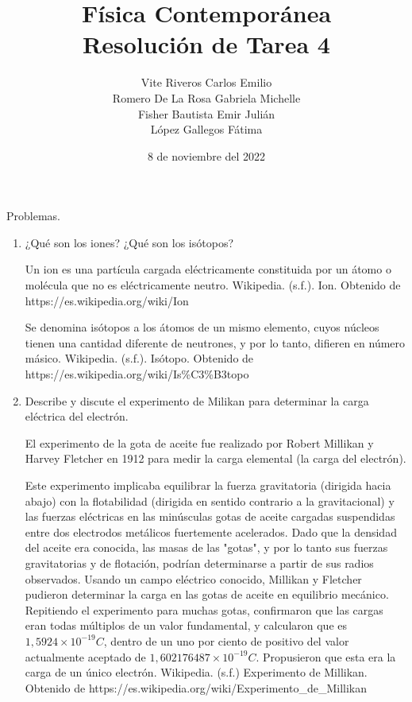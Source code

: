 \documentclass[10pt, a4paper]{article}
\title{Física Contemporánea\\Resolución de Tarea 4}
\author{Vite Riveros Carlos Emilio\\ Romero De La Rosa Gabriela Michelle\\ 
        Fisher Bautista Emir Julián\\ López Gallegos Fátima}
\date{8 de noviembre del 2022}
\begin{document}
    \maketitle

    Problemas.
    \begin{enumerate}
        \item ¿Qué son los iones? ¿Qué son los isótopos?
        
        \begin{center}
            Un ion es una partícula cargada eléctricamente constituida por un átomo o molécula que no es 
            eléctricamente neutro. Wikipedia. (s.f.). Ion. Obtenido de https://es.wikipedia.org/wiki/Ion
            
            Se denomina isótopos a los átomos de un mismo elemento, cuyos núcleos 
            tienen una cantidad diferente de neutrones, y por lo tanto, difieren en número másico.
            Wikipedia. (s.f.). Isótopo. Obtenido de https://es.wikipedia.org/wiki/Is\%C3\%B3topo
            
        \end{center}

        \item Describe y discute el experimento de Milikan para determinar la carga eléctrica del electrón.
        
        \begin{center}
            El experimento de la gota de aceite fue realizado por Robert Millikan y Harvey Fletcher en 1912 
            para medir la carga elemental (la carga del electrón).

            Este experimento implicaba equilibrar la fuerza gravitatoria (dirigida hacia abajo) con la flotabilidad 
            (dirigida en sentido contrario a la gravitacional) y las fuerzas eléctricas en las minúsculas gotas 
            de aceite cargadas suspendidas entre dos electrodos metálicos fuertemente acelerados. Dado que la 
            densidad del aceite era conocida, las masas de las "gotas", y por lo tanto sus fuerzas gravitatorias y 
            de flotación, podrían determinarse a partir de sus radios observados. Usando un campo eléctrico conocido, 
            Millikan y Fletcher pudieron determinar la carga en las gotas de aceite en equilibrio mecánico. Repitiendo 
            el experimento para muchas gotas, confirmaron que las cargas eran todas múltiplos de un valor fundamental, 
            y calcularon que es $1,5924\times 10^{-19} \si{C}$, dentro de un uno por ciento de positivo del valor actualmente aceptado
            de $1,602176487\times 10^{-19} \si{C}$. Propusieron que esta era la carga de un único electrón. 
            Wikipedia. (s.f.) Experimento de Millikan. Obtenido de https://es.wikipedia.org/wiki/Experimento\_de\_Millikan


\end{center}
\end{enumerate}
\end{document}

